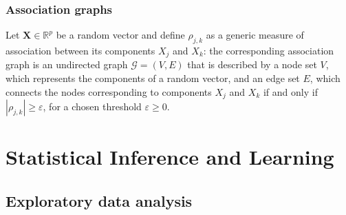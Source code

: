 \documentclass{report}
\begin{document}
\section{Association graphs}
Let $\displaystyle \mathbf{X} \in \mathbb{R}^p$ be a random vector and define $\displaystyle \rho_{j, k}$ as a generic measure of association between its components $\displaystyle X_j$ and $\displaystyle X_k$: the corresponding association graph is an undirected graph $\displaystyle \mathcal{G} = (V, E)$ that is described by a node set $\displaystyle V$, which represents the components of a random vector, and an edge set $\displaystyle E$, which connects the nodes corresponding to components $\displaystyle X_j$ and $\displaystyle X_k$ if and only if $\displaystyle |\rho_{j, k}| \ge \varepsilon$, for a chosen threshold $\displaystyle \varepsilon \ge 0$.

\part{Statistical Inference and Learning}

\chapter{Exploratory data analysis}
\end{document}

